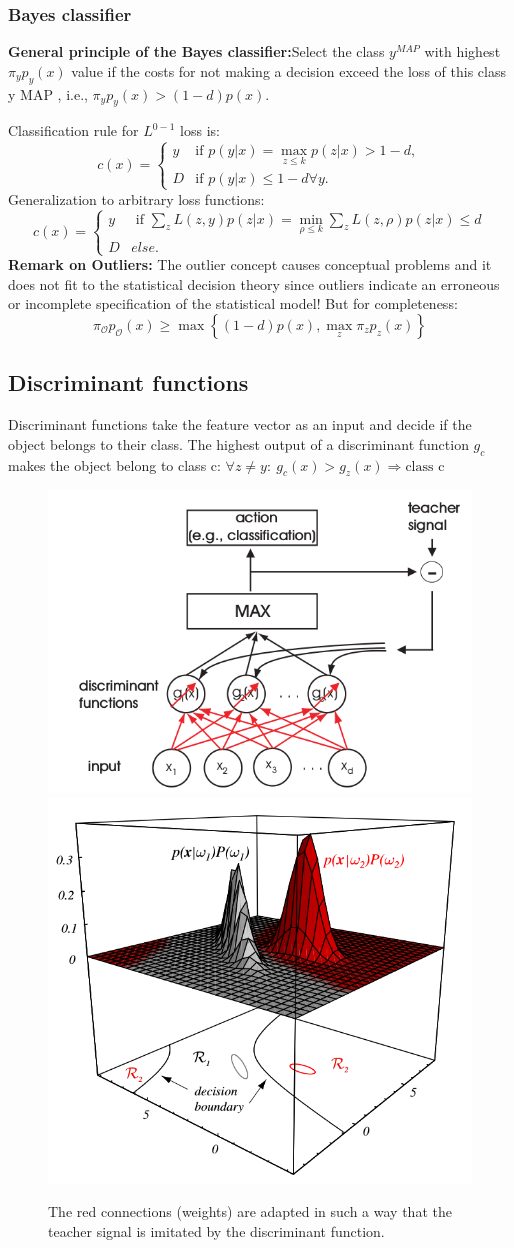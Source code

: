 \documentclass[MachineLearning]{subfiles}
\begin{document}
\subsubsection{Bayes classifier}
\textbf{General principle of the Bayes classifier:}Select the class \(y^{MAP}\) with highest \(\pi_y p_y (x)\) value if the costs for not making a decision exceed the loss of this class y MAP , i.e., \(\pi_y p_y (x) > (1 - d)p(x)\).

Classification rule for \(L^{0- 1}\) loss is:
\[
c(x) =
\begin{cases}
y & \mbox{if } p(y|x) = \max\limits_{z \leq k} p(z|x) > 1 - d,\\
D & \mbox{if } p(y|x) \leq 1 - d \forall y.
\end{cases}
\]
Generalization to arbitrary loss functions:
\[
c(x) =
\begin{cases}
y & \mbox{ if } \sum\limits_z L(z, y)p(z|x) = \min\limits_{\rho\leq k} \sum\limits_z L(z, \rho)p(z|x) \leq d\\
D & else .
\end{cases}
\]
\textbf{Remark on Outliers:}
The outlier concept causes conceptual problems and it does not fit to the statistical decision theory since outliers indicate an erroneous or incomplete specification of the statistical model! But for completeness:
\[\pi_\mathcal{O} p_\mathcal{O} (x) \geq \max\left\{(1 - d)p(x), \max\limits_z \pi_z p_z (x)\right\}\]
\subsection{Discriminant functions}
Discriminant functions take the feature vector as an input and decide if the object belongs to their class. The highest output of a discriminant function \(g_c\) makes the object belong to class c: \(\forall z\neq y:~g_c(x) > g_z(x) \Rightarrow \text{class c} \)
\begin{figure}[H]
\centering
\includegraphics[width=0.47\linewidth]{figs/Adaptive-Discriminant-functions.png}
\includegraphics[width=0.47\linewidth]{figs/DF-decision-boundaries.png}
\caption{The red connections (weights) are adapted in such a way that the
teacher signal is imitated by the discriminant function.}
\end{figure}
\end{document}
